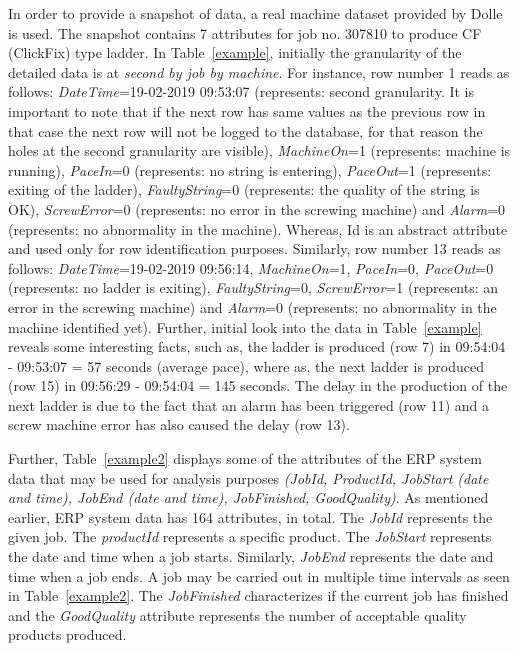\documentclass[runningheads]{llncs}
\begin{document}
In order to provide a snapshot of data, a real machine dataset provided by Dolle is used. The snapshot contains 7 attributes for job no. 307810 to produce CF (ClickFix) type ladder. In Table~\ref{example}, initially the granularity of the detailed data is at \emph{second by job by machine}. For instance, row number 1 reads as follows: \emph{DateTime}=19-02-2019 09:53:07 (represents: second granularity. It is important to note that if the next row has same values as the previous row in that case the next row will not be logged to the database, for that reason the holes at the second granularity are visible), \emph{MachineOn}=1 (represents: machine is running), \emph{PaceIn}=0 (represents: no string is entering), \emph{PaceOut}=1 (represents: exiting of the ladder), \emph{FaultyString}=0 (represents: the quality of the string is OK), \emph{ScrewError}=0 (represents: no error in the screwing machine) and \emph{Alarm}=0 (represents: no abnormality in the machine). Whereas, Id is an abstract attribute and used only for row identification purposes. Similarly, row number 13 reads as follows: \emph{DateTime}=19-02-2019 09:56:14, \emph{MachineOn}=1, \emph{PaceIn}=0, \emph{PaceOut}=0 (represents: no ladder is exiting), \emph{FaultyString}=0, \emph{ScrewError}=1 (represents: an error in the screwing machine) and \emph{Alarm}=0 (represents: no abnormality in the machine identified yet). Further, initial look into the data in Table~\ref{example} reveals some interesting facts, such as, the ladder is produced (row 7) in 09:54:04 - 09:53:07 = 57 seconds (average pace), where as, the next ladder is produced (row 15) in 09:56:29 - 09:54:04 = 145 seconds. The delay in the production of the next ladder is due to the fact that an alarm has been triggered (row 11) and a screw machine error has also caused the delay (row 13). 

Further, Table~\ref{example2} displays some of the attributes of the ERP system data that may be used for analysis purposes \emph{(JobId, ProductId, JobStart (date and time), JobEnd (date and time), JobFinished, GoodQuality)}. As mentioned earlier, ERP system data has 164 attributes, in total. The \emph{JobId} represents the given job. The \emph{productId} represents a specific product. The \emph{JobStart} represents the date and time when a job starts. Similarly, \emph{JobEnd} represents the date and time when a job ends. A job may be carried out in multiple time intervals as seen in Table~\ref{example2}. The \emph{JobFinished} characterizes if the current job has finished and the \emph{GoodQuality} attribute represents the number of acceptable quality products produced. 
\end{document}
